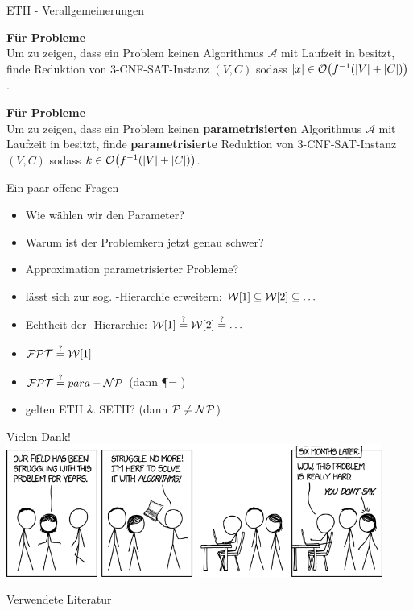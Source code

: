 \documentclass[navbaroff]{sdqbeamer}
\begin{document}
\begin{frame}{ETH - Verallgemeinerungen}
    \begin{blueblock}{}
        \textbf{Für  Probleme}
        \\
        Um zu zeigen, dass ein Problem keinen Algorithmus $\mathcal{A}$
        mit Laufzeit in  besitzt, finde Reduktion von \textsc{3-CNF-SAT}-Instanz $(V, C)$ sodass
        $|x| \in \operatorname{\mathcal{O}}\bigl(f^{-1}(|V| + |C|)\bigr)$.
    \end{blueblock}

    \begin{blueblock}{}
        \textbf{Für  Probleme}
        \\
        Um zu zeigen, dass ein Problem keinen \textbf{parametrisierten} Algorithmus $\mathcal{A}$
        mit Laufzeit in  besitzt, finde \textbf{parametrisierte} Reduktion von \textsc{3-CNF-SAT}-Instanz $(V, C)$ sodass
        $k \in \operatorname{\mathcal{O}}\bigl(f^{-1}(|V| + |C|)\bigr)$.
    \end{blueblock}
\end{frame}

\begin{frame}{Ein paar offene Fragen}
    \begin{itemize}
        \item Wie wählen wir den Parameter?
        \item Warum ist der Problemkern jetzt genau schwer?
        \item Approximation parametrisierter Probleme?
        \item \W[1] lässt sich zur sog. \W-Hierarchie erweitern: $\mathcal{W}[1] \subseteq \mathcal{W}[2] \subseteq \dots $
        \item Echtheit der \W-Hierarchie: $\mathcal{W}[1] \stackrel{?}{=} \mathcal{W}[2] \stackrel{?}{=} \dots $
        \item $\mathcal{FPT} \stackrel{?}{=} \mathcal{W}[1]$
        \item $\mathcal{FPT} \stackrel{?}{=} para-\mathcal{NP} $ (dann \P = \NP)
        \item gelten ETH \& SETH? (dann $\mathcal{P} \neq \mathcal{NP}$)
    \end{itemize}
\end{frame}

\begin{frame}{Vielen Dank!}
    \centering
    \includegraphics[width=350pt]{images/xkcd.png}
\end{frame}

\begin{frame}{Verwendete Literatur}
    \nocite{*}
    \printbibliography
\end{frame}
\end{document}
